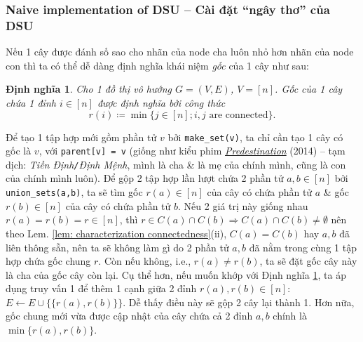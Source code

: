 \documentclass{article}
\newtheorem{dinhnghia}{Định nghĩa}
\begin{document}

\subsubsection{Naive implementation of DSU -- Cài đặt ``ngây thơ'' của DSU}
Nếu 1 cây được đánh số sao cho nhãn của node cha luôn nhỏ hơn nhãn của node con thì ta có thể dễ dàng định nghĩa khái niệm {\it gốc} của 1 cây như sau:

\begin{dinhnghia}
    \label{def: root of tree}
    Cho 1 đồ thị vô hướng $G = (V,E)$, $V = [n]$. {\rm Gốc} của 1 cây chứa 1 đỉnh $i\in[n]$ được định nghĩa bởi công thức
    \begin{equation*}
        r(i)\coloneqq\min\{j\in[n];i,j\mbox{ are connected}\}.
    \end{equation*}
\end{dinhnghia}
Để tạo 1 tập hợp mới gồm phần tử $v$ bởi \verb|make_set(v)|, ta chỉ cần tạo 1 cây có gốc là $v$, với \verb|parent[v] = v| (giống như kiểu phim \href{https://www.imdb.com/title/tt2397535/}{\it Predestination} (2014) -- tạm dịch: {\it Tiền Định{\tt/}Định Mệnh}, mình là cha \& là mẹ của chính mình, cũng là con của chính mình luôn). Để gộp 2 tập hợp lần lượt chứa 2 phần tử $a,b\in[n]$ bởi \verb|union_sets(a,b)|, ta sẽ tìm gốc $r(a)\in[n]$ của cây có chứa phần tử $a$ \& gốc $r(b)\in[n]$ của cây có chứa phần tử $b$. Nếu 2 giá trị này giống nhau $r(a) = r(b) = r\in[n]$, thì $r\in C(a)\cap C(b)\Rightarrow C(a)\cap C(b)\ne\emptyset$ nên theo Lem. \ref{lem: characterization connectedness}(ii), $C(a) = C(b)$ hay $a,b$ đã liên thông sẵn, nên ta sẽ không làm gì do 2 phần tử $a,b$ đã nằm trong cùng 1 tập hợp chứa gốc chung $r$. Còn nếu không, i.e., $r(a)\ne r(b)$, ta sẽ đặt gốc cây này là cha của gốc cây còn lại. Cụ thể hơn, nếu muốn khớp với Định nghĩa \ref{def: root of tree}, ta áp dụng truy vấn 1 để thêm 1 cạnh giữa 2 đỉnh $r(a),r(b)\in[n]$: $E\leftarrow E\cup\{\{r(a),r(b)\}\}$. Dễ thấy điều này sẽ gộp 2 cây lại thành 1. Hơn nữa, gốc chung mới vừa được cập nhật của cây chứa cả 2 đỉnh $a,b$ chính là $\min\{r(a),r(b)\}$.
\end{document}
